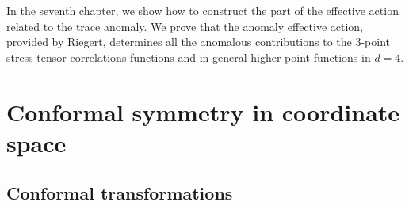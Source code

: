 \documentclass[a4paper,11pt,openright,twoside]{book}
\numberwithin{equation}{section}
\begin{document}
In the seventh chapter, we show how to construct the part of the effective action related to the trace anomaly. We prove that the anomaly effective action, provided by Riegert, determines all the anomalous contributions to the $3$-point stress tensor correlations functions and in general higher point functions in $d=4$. 
\mainmatter
\chapter{Conformal symmetry in coordinate space}\label{chapter1}


\section{Conformal transformations}
\label{prima}
\end{document}
